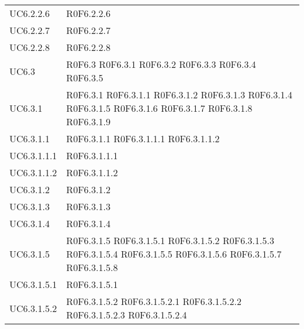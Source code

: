 \begin{longtable}{p{2.5cm}!{\VRule[1pt]}p{5.5cm}}
UC6.2.2.6 & R0F6.2.2.6\\
UC6.2.2.7 & R0F6.2.2.7\\
UC6.2.2.8 & R0F6.2.2.8\\
UC6.3 & R0F6.3
	\newline R0F6.3.1
	\newline R0F6.3.2
	\newline R0F6.3.3
	\newline R0F6.3.4
	\newline R0F6.3.5\\
UC6.3.1 & R0F6.3.1
	\newline R0F6.3.1.1
	\newline R0F6.3.1.2
	\newline R0F6.3.1.3
	\newline R0F6.3.1.4
	\newline R0F6.3.1.5
	\newline R0F6.3.1.6
	\newline R0F6.3.1.7
	\newline R0F6.3.1.8
	\newline R0F6.3.1.9\\
UC6.3.1.1 & R0F6.3.1.1
	\newline R0F6.3.1.1.1
	\newline R0F6.3.1.1.2\\
UC6.3.1.1.1 & R0F6.3.1.1.1\\
UC6.3.1.1.2 & R0F6.3.1.1.2\\
UC6.3.1.2 & R0F6.3.1.2\\
UC6.3.1.3 & R0F6.3.1.3\\
UC6.3.1.4 & R0F6.3.1.4\\
UC6.3.1.5 & R0F6.3.1.5
	\newline R0F6.3.1.5.1
	\newline R0F6.3.1.5.2
	\newline R0F6.3.1.5.3
	\newline R0F6.3.1.5.4
	\newline R0F6.3.1.5.5
	\newline R0F6.3.1.5.6
	\newline R0F6.3.1.5.7
	\newline R0F6.3.1.5.8\\
UC6.3.1.5.1 & R0F6.3.1.5.1\\
UC6.3.1.5.2 & R0F6.3.1.5.2
	\newline R0F6.3.1.5.2.1
	\newline R0F6.3.1.5.2.2
	\newline R0F6.3.1.5.2.3
	\newline R0F6.3.1.5.2.4\\

\end{longtable}
